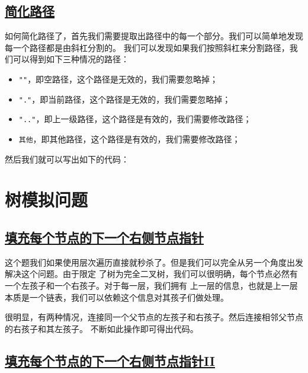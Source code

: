 \documentclass[../../main.tex]{subfiles}
\begin{document}
\subsection{\href{https://leetcode.cn/problems/simplify-path/}{简化路径}}

如何简化路径了，首先我们需要提取出路径中的每一个部分。我们可以简单地发现每一个路径都是由斜杠分割的。
我们可以发现如果我们按照斜杠来分割路径，我们可以得到如下三种情况的路径：

\begin{itemize}
  \item \texttt{""}，即空路径，这个路径是无效的，我们需要忽略掉；
  \item \texttt{"."}，即当前路径，这个路径是无效的，我们需要忽略掉；
  \item \texttt{".."}，即上一级路径，这个路径是有效的，我们需要修改路径；
  \item \texttt{其他}，即其他路径，这个路径是有效的，我们需要修改路径；
\end{itemize}

然后我们就可以写出如下的代码：



\section{树模拟问题}

\subsection{\href{https://leetcode.cn/problems/populating-next-right-pointers-in-each-node/}
{填充每个节点的下一个右侧节点指针}}

这个题我们如果使用层次遍历直接就秒杀了。但是我们可以完全从另一个角度出发解决这个问题。由于限定
了树为完全二叉树，我们可以很明确，每个节点必然有一个左孩子和一个右孩子。对于每一层，我们拥有
上一层的信息，也就是上一层本质是一个链表，我们可以依赖这个信息对其孩子们做处理。

很明显，有两种情况，连接同一个父节点的左孩子和右孩子。然后连接相邻父节点的右孩子和其左孩子。
不断如此操作即可得出代码。



\subsection{\href{https://leetcode.cn/problems/populating-next-right-pointers-in-each-node-ii/}
{填充每个节点的下一个右侧节点指针II}}
\end{document}
